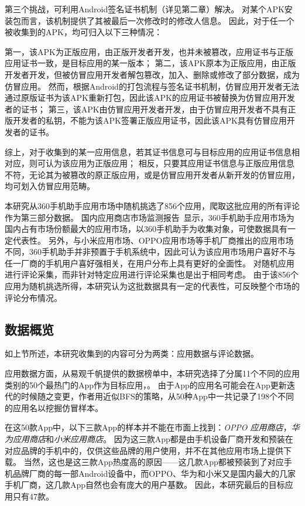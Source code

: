 第三个挑战，可利用Android签名证书机制（详见第二章）解决。
对某个APK安装包而言，该机制提供了其被最后一次修改时的修改人信息。
因此，对于任一个被\mytool 收集到的APK，均可归入以下三种情况：

第一，该APK为正版应用，由正版开发者开发，也并未被篡改，应用证书与正版应用证书一致，是目标应用的某一版本；
第二，该APK原本为正版应用，由正版开发者开发，但被仿冒应用开发者解包篡改，加入、删除或修改了部分数据，成为仿冒应用。
然而，根据Android的打包流程与签名证书机制，仿冒应用开发者无法通过原版证书为该APK重新打包，因此该APK的应用证书被替换为仿冒应用开发者的证书；
第三，该APK由仿冒应用开发者开发，由于仿冒应用开发者不具有正版开发者的私钥，不能为该APK签署正版应用证书，因此该APK具有仿冒应用开发者的证书。

综上，对于收集到的某一应用信息，若其证书信息可与目标应用的应用证书信息相对应，则可认为该应用为正版应用；
相反，只要其应用证书信息与正版应用信息不符，无论其为被篡改的原正版应用，或是仿冒应用开发者从新开发的仿冒应用，均可划入仿冒应用范畴。

本研究从360手机助手应用市场中随机挑选了856个应用，爬取这批应用的所有评论作为第三部分数据。
国内应用商店市场监测报告~\cite{ChineseAppStoreReport}显示，360手机助手应用市场为国内占有市场份额最大的应用市场，以360手机助手为收集对象，可使数据具有一定代表性。
另外，与小米应用市场、OPPO应用市场等手机厂商推出的应用市场不同，360手机助手并非预置于手机系统中，因此可认为该应用市场用户喜好不与任一厂商的手机用户喜好强相关，在用户分布上具有更好的全面性。
对随机应用进行评论采集，而非针对特定应用进行评论采集也是出于相同考虑。
由于该856个应用为随机挑选所得，本研究认为这批数据具有一定的代表性，可反映整个市场的评论分布情况。

\subsection{数据概览}

如上节所述，本研究收集到的内容可分为两类：应用数据与评论数据。

应用数据方面，从易观千帆提供的数据榜单中，本研究选择了分属11个不同的应用类别的50个最热门的App作为目标应用，。
由于App的应用名可能会在App更新迭代的时候随之变更，作者用近似BFS的策略，从50种App中一共记录了198个不同的应用名以挖掘仿冒样本。

在这50款App中，以下三款App的样本并不能在市面上找到：\emph{OPPO 应用商店}，\emph{华为应用商店}和\emph{小米应用商店}。
因为这三款App都是由手机设备厂商开发和预装在对应品牌的手机中的，仅供这些品牌的用户使用，并不在其他应用市场上提供下载。
当然，这也是这三款App热度高的原因——这几款App都被预装到了对应手机品牌厂商的每一部Android设备中，而OPPO、华为和小米又是国内最大的几家手机厂商，这几款App自然也会有庞大的用户基数。
因此，本研究最后的目标应用只有47款。

